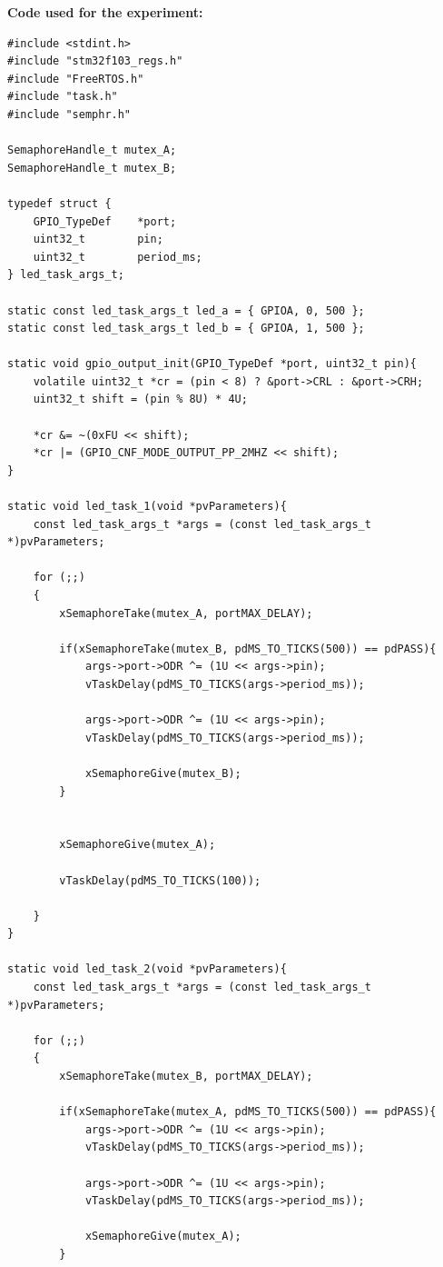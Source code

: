 ﻿\documentclass[12pt,a4paper]{article}
\begin{document}
\textbf{Code used for the experiment:}
\begin{lstlisting}
#include <stdint.h>
#include "stm32f103_regs.h"
#include "FreeRTOS.h"
#include "task.h"
#include "semphr.h"

SemaphoreHandle_t mutex_A;
SemaphoreHandle_t mutex_B;

typedef struct {
    GPIO_TypeDef    *port;
    uint32_t        pin;
    uint32_t        period_ms;
} led_task_args_t;

static const led_task_args_t led_a = { GPIOA, 0, 500 };
static const led_task_args_t led_b = { GPIOA, 1, 500 };

static void gpio_output_init(GPIO_TypeDef *port, uint32_t pin){
    volatile uint32_t *cr = (pin < 8) ? &port->CRL : &port->CRH;
    uint32_t shift = (pin % 8U) * 4U;

    *cr &= ~(0xFU << shift);
    *cr |= (GPIO_CNF_MODE_OUTPUT_PP_2MHZ << shift);
}

static void led_task_1(void *pvParameters){
    const led_task_args_t *args = (const led_task_args_t *)pvParameters;

    for (;;)
    {
        xSemaphoreTake(mutex_A, portMAX_DELAY);

        if(xSemaphoreTake(mutex_B, pdMS_TO_TICKS(500)) == pdPASS){
            args->port->ODR ^= (1U << args->pin);
            vTaskDelay(pdMS_TO_TICKS(args->period_ms));

            args->port->ODR ^= (1U << args->pin);
            vTaskDelay(pdMS_TO_TICKS(args->period_ms));

            xSemaphoreGive(mutex_B);
        }


        xSemaphoreGive(mutex_A);

        vTaskDelay(pdMS_TO_TICKS(100));

    }
}

static void led_task_2(void *pvParameters){
    const led_task_args_t *args = (const led_task_args_t *)pvParameters;

    for (;;)
    {
        xSemaphoreTake(mutex_B, portMAX_DELAY);

        if(xSemaphoreTake(mutex_A, pdMS_TO_TICKS(500)) == pdPASS){
            args->port->ODR ^= (1U << args->pin);
            vTaskDelay(pdMS_TO_TICKS(args->period_ms));

            args->port->ODR ^= (1U << args->pin);
            vTaskDelay(pdMS_TO_TICKS(args->period_ms));

            xSemaphoreGive(mutex_A);
        }



\end{lstlisting}
\end{document}
